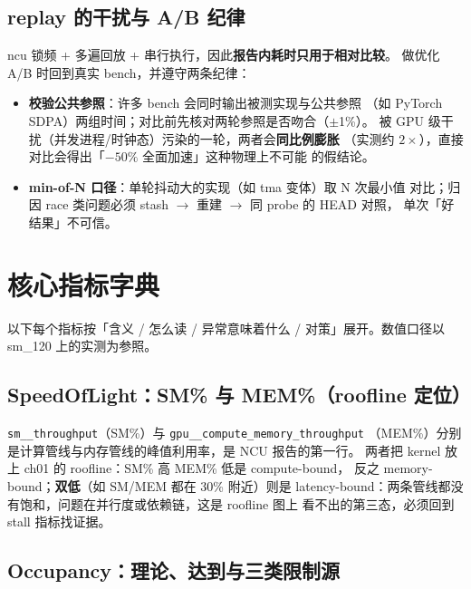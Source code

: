 \subsection{replay 的干扰与 A/B 纪律}

ncu 锁频 + 多遍回放 + 串行执行，因此\textbf{报告内耗时只用于相对比较}。
做优化 A/B 时回到真实 bench，并遵守两条纪律：

\begin{itemize}
\item \textbf{校验公共参照}：许多 bench 会同时输出被测实现与公共参照
  （如 PyTorch SDPA）两组时间；对比前先核对两轮参照是否吻合（$\pm$1\%）。
  被 GPU 级干扰（并发进程/时钟态）污染的一轮，两者会\textbf{同比例膨胀}
  （实测约 $2\times$），直接对比会得出「$-50\%$ 全面加速」这种物理上不可能
  的假结论。
\item \textbf{min-of-N 口径}：单轮抖动大的实现（如 tma 变体）取 N 次最小值
  对比；归因 race 类问题必须 stash $\to$ 重建 $\to$ 同 probe 的 HEAD 对照，
  单次「好结果」不可信。
\end{itemize}

\section{核心指标字典}\label{sec:ch00-metrics}

以下每个指标按「含义 / 怎么读 / 异常意味着什么 / 对策」展开。数值口径以
sm\_120 上的实测为参照。

\subsection{SpeedOfLight：SM\% 与 MEM\%（roofline 定位）}

\texttt{sm\_\allowbreak{}\_\allowbreak{}throughput}（SM\%）与 \texttt{gpu\_\allowbreak{}\_\allowbreak{}compute\_\allowbreak{}memory\_\allowbreak{}throughput}
（MEM\%）分别是计算管线与内存管线的峰值利用率，是 NCU 报告的第一行。
两者把 kernel 放上 ch01 的 roofline：SM\% 高 MEM\% 低是 compute-bound，
反之 memory-bound；\textbf{双低}（如 SM/MEM 都在 30\% 附近）则是
latency-bound：两条管线都没有饱和，问题在并行度或依赖链，这是 roofline 图上
看不出的第三态，必须回到 stall 指标找证据。

\subsection{Occupancy：理论、达到与三类限制源}

